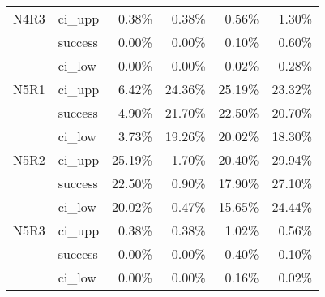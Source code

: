 \begin{tabular}{llrrrr}
N4R3 & ci\_upp &       0.38\% &  0.38\% &        0.56\% &  1.30\% \\
     & success &       0.00\% &  0.00\% &        0.10\% &  0.60\% \\
     & ci\_low &       0.00\% &  0.00\% &        0.02\% &  0.28\% \\
N5R1 & ci\_upp &       6.42\% & 24.36\% &       25.19\% & 23.32\% \\
     & success &       4.90\% & 21.70\% &       22.50\% & 20.70\% \\
     & ci\_low &       3.73\% & 19.26\% &       20.02\% & 18.30\% \\
N5R2 & ci\_upp &      25.19\% &  1.70\% &       20.40\% & 29.94\% \\
     & success &      22.50\% &  0.90\% &       17.90\% & 27.10\% \\
     & ci\_low &      20.02\% &  0.47\% &       15.65\% & 24.44\% \\
N5R3 & ci\_upp &       0.38\% &  0.38\% &        1.02\% &  0.56\% \\
     & success &       0.00\% &  0.00\% &        0.40\% &  0.10\% \\
     & ci\_low &       0.00\% &  0.00\% &        0.16\% &  0.02\% \\
\bottomrule
\end{tabular}

